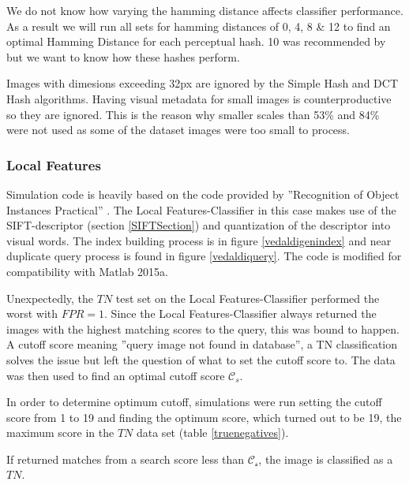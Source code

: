 \documentclass[english,12pt,a4paper,pdftex,elec,utf8]{aaltothesis}
\begin{document}
We do not know how varying the hamming distance affects classifier performance. As a result we will run all sets for hamming distances of 0, 4, 8 \& 12 to find an optimal Hamming Distance for each perceptual hash. 10 was recommended by \cite{Zauner2010} but we want to know how these hashes perform.

Images with dimesions exceeding 32px are ignored by the Simple Hash and DCT Hash algorithms. Having visual metadata for small images is counterproductive so they are ignored. This is the reason why smaller scales than 53\% and 84\% were not used as some of the dataset images were too small to process.

\subsubsection{Local Features}
Simulation code is heavily based on the code provided by ''Recognition of Object Instances Practical'' \cite{Vedaldi2012}. The Local Features-Classifier in this case makes use of the SIFT-descriptor (section \ref{SIFTSection}) and quantization of the descriptor into visual words. The index building process is in figure \ref{vedaldigenindex} and near duplicate query process is found in figure \ref{vedaldiquery}. The code is modified for compatibility with Matlab 2015a.

Unexpectedly, the $TN$ test set on the Local Features-Classifier performed the worst with $FPR = 1$. Since the Local Features-Classifier always returned the images with the highest matching scores to the query, this was bound to happen. A cutoff score meaning ''query image not found in database'', a TN classification solves the issue but left the question of what to set the cutoff score to. The data was then used to find an optimal cutoff score $\mathcal{C}_s$.

In order to determine optimum cutoff, simulations were run setting the cutoff score from 1 to 19 and finding the optimum score, which turned out to be 19, the maximum score in the $TN$ data set (table \ref{truenegatives}).

If returned matches from a search score less than $\mathcal{C_s}$, the image is classified as a $TN$.
\end{document}
